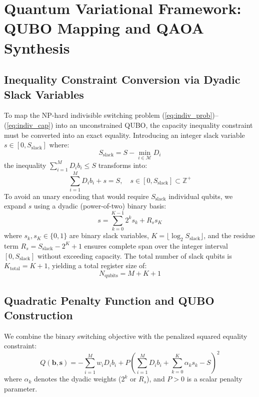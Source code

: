 \documentclass[11pt,a4paper]{article}
\theoremstyle{definition}
\theoremstyle{remark}
\begin{document}
\section{Quantum Variational Framework: QUBO Mapping and QAOA Synthesis}
\label{sec:quantum_formulation}

\subsection{Inequality Constraint Conversion via Dyadic Slack Variables}
To map the NP-hard indivisible switching problem (\ref{eq:indiv_prob})--(\ref{eq:indiv_cap}) into an unconstrained QUBO, the capacity inequality constraint must be converted into an exact equality. Introducing an integer slack variable $s \in [0, S_{\text{slack}}]$ where:
\begin{equation}
S_{\text{slack}} = S - \min_{i \in \mathcal{M}} D_i
\end{equation}
the inequality $\sum_{i=1}^M D_i b_i \le S$ transforms into:
\begin{equation}
\sum_{i=1}^M D_i b_i + s = S, \quad s \in [0, S_{\text{slack}}] \subset \mathbb{Z}^+
\end{equation}
To avoid an unary encoding that would require $S_{\text{slack}}$ individual qubits, we expand $s$ using a dyadic (power-of-two) binary basis:
\begin{equation}
s = \sum_{k=0}^{K-1} 2^k s_k + R_s s_K
\label{eq:dyadic_slack}
\end{equation}
where $s_k, s_K \in \{0, 1\}$ are binary slack variables, $K = \lfloor \log_2 S_{\text{slack}} \rfloor$, and the residue term $R_s = S_{\text{slack}} - 2^K + 1$ ensures complete span over the integer interval $[0, S_{\text{slack}}]$ without exceeding capacity. The total number of slack qubits is $K_{\text{total}} = K + 1$, yielding a total register size of:
\begin{equation}
N_{\text{qubits}} = M + K + 1
\end{equation}

\subsection{Quadratic Penalty Function and QUBO Construction}
We combine the binary switching objective with the penalized squared equality constraint:
\begin{equation}
Q(\mathbf{b}, \mathbf{s}) = -\sum_{i=1}^M w_i D_i b_i + P \left( \sum_{i=1}^M D_i b_i + \sum_{k=0}^K \alpha_k s_k - S \right)^2
\label{eq:qubo_full}
\end{equation}
where $\alpha_k$ denotes the dyadic weights ($2^k$ or $R_s$), and $P > 0$ is a scalar penalty parameter.
\end{document}
